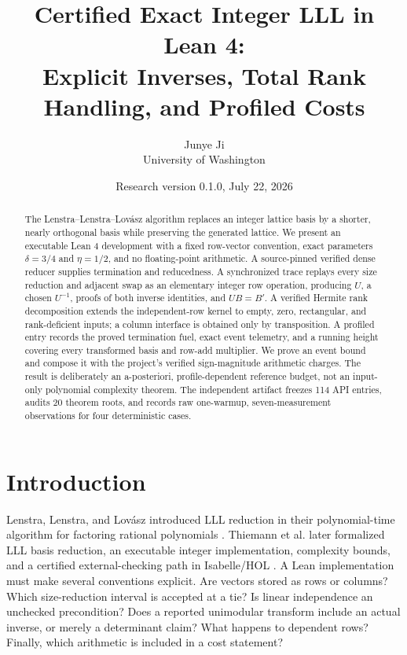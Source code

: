 \documentclass[11pt]{article}
\title{Certified Exact Integer LLL in Lean 4:\\
Explicit Inverses, Total Rank Handling, and Profiled Costs}
\author{Junye Ji\\University of Washington}
\date{Research version 0.1.0, July 22, 2026}
\begin{document}
\maketitle

\begin{abstract}
The Lenstra--Lenstra--Lov\'asz algorithm replaces an integer lattice basis by
a shorter, nearly orthogonal basis while preserving the generated lattice.
We present an executable Lean 4 development with a fixed row-vector
convention, exact parameters $\delta=3/4$ and $\eta=1/2$, and no
floating-point arithmetic.  A source-pinned verified dense reducer supplies
termination and reducedness.  A synchronized trace replays every size
reduction and adjacent swap as an elementary integer row operation, producing
$U$, a chosen $U^{-1}$, proofs of both inverse identities, and $UB=B'$.  A
verified Hermite rank decomposition extends the independent-row kernel to
empty, zero, rectangular, and rank-deficient inputs; a column interface is
obtained only by transposition.  A profiled entry records the proved
termination fuel, exact event telemetry, and a running height covering every
transformed basis and row-add multiplier.  We prove an event bound and compose
it with the project's verified sign-magnitude arithmetic charges.  The result
is deliberately an a-posteriori, profile-dependent reference budget, not an
input-only polynomial complexity theorem.  The independent artifact freezes
114 API entries, audits 20 theorem roots, and records raw one-warmup,
seven-measurement observations for four deterministic cases.
\end{abstract}

\section{Introduction}

Lenstra, Lenstra, and Lov\'asz introduced LLL reduction in their polynomial-time
algorithm for factoring rational polynomials
\citep{lenstraLenstraLovasz1982}.  Thiemann et al. later formalized LLL basis
reduction, an executable integer implementation, complexity bounds, and a
certified external-checking path in Isabelle/HOL
\citep{thiemannEtAl2020lll}.  A Lean
implementation must make several conventions explicit.  Are vectors stored
as rows or columns?  Which size-reduction interval is accepted at a tie?  Is
linear independence an unchecked precondition?  Does a reported unimodular
transform include an actual inverse, or merely a determinant claim?  What
happens to dependent rows?  Finally, which arithmetic is included in a cost
statement?
\end{document}
